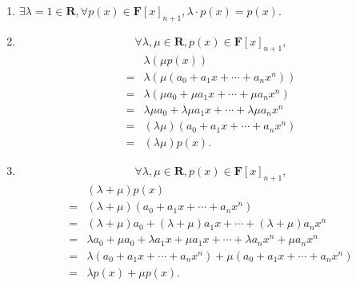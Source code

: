 \begin{solution}
\begin{enumerate}
\begin{enumerate}
                    \item $\exists \lambda = 1 \in \mathbf{R},\forall p(x) \in \mathbf{F}[x]_{n+1}, \lambda \cdot p(x) = p(x)$.

                    \item \[\forall \lambda, \mu \in \mathbf{R}, p(x) \in \mathbf{F}[x]_{n+1},\]
                    \begin{align*}
                        & \lambda(\mu p(x)) \\ ={} & \lambda(\mu(a_0 + a_1x + \cdots + a_nx^n)) \\ ={} & \lambda(\mu a_0 + \mu a_1x + \cdots + \mu a_nx^n) \\ ={} & \lambda \mu a_0 + \lambda \mu a_1x + \cdots + \lambda \mu a_nx^n \\ ={} & (\lambda \mu) (a_0 + a_1x + \cdots + a_nx^n) \\ ={} & (\lambda \mu)p(x).
                    \end{align*}

                    \item \[\forall \lambda, \mu \in \mathbf{R}, p(x) \in \mathbf{F}[x]_{n+1},\]
                    \begin{align*}
                        & (\lambda + \mu) p(x) \\ ={} & (\lambda + \mu)(a_0 + a_1x + \cdots + a_nx^n) \\ ={} & (\lambda + \mu)a_0 + (\lambda + \mu)a_1x + \cdots + (\lambda + \mu)a_nx^n \\ ={} & \lambda a_0 + \mu a_0 + \lambda a_1x + \mu a_1x+ \cdots + \lambda a_nx^n + \mu a_nx^n \\ ={} & \lambda(a_0 + a_1x + \cdots + a_nx^n) + \mu(a_0 + a_1x + \cdots + a_nx^n) \\ ={} & \lambda p(x) + \mu p(x).
                    \end{align*}


\end{enumerate}
\end{enumerate}
\end{solution}
